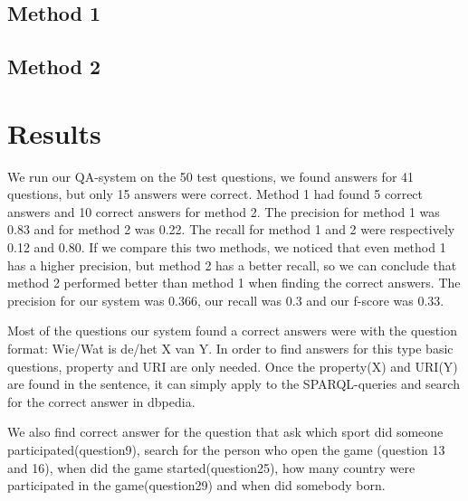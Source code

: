 \documentclass[a4paper,11pt]{article}
\begin{document}


\subsection{Method 1}


\subsection{Method 2}



\section{Results}
We run our QA-system on the 50 test questions, we found answers for 41 questions, but only 15 answers were correct. Method 1 had found 5 correct answers and 10 correct answers for method 2. The precision for method 1 was 0.83 and for method 2 was 0.22. The recall for method 1 and 2 were respectively 0.12 and 0.80.  If we compare this two methods, we noticed that even method 1 has a higher precision, but method 2 has a better recall, so we can conclude that method 2 performed better than method 1 when finding the correct answers. The precision for our system was 0.366, our recall was 0.3 and our f-score was 0.33.

Most of the questions our system found a correct answers were with the question format: Wie/Wat is de/het X van Y. In order to find answers for this type basic questions, property and URI are only needed. Once the property(X) and URI(Y) are found in the sentence, it can simply apply to the SPARQL-queries and search for the correct answer in dbpedia.

We also find correct answer for the question that ask which sport did someone participated(question9), search for the person who open the game (question 13 and 16), when did the game started(question25), how many country were participated in the game(question29) and when did somebody born.


%
%
%
%
%
%
%
\end{document}
